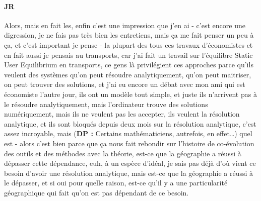 \paragraph{JR}

Alors, mais en fait les, enfin c'est une impression que j'en ai - c'est encore une digression, je ne fais pas très bien les entretiens, mais ça me fait penser un peu à ça, et c'est important je pense - la plupart des tous ces travaux d'économistes et en fait aussi je pensais au transports, car j'ai fait un travail sur l'équilibre Static User Equilibrium en transports, ce gens là privilégient ces approches parce qu'ils veulent des systèmes qu'on peut résoudre analytiquement, qu'on peut maitriser, on peut trouver des solutions, et j'ai eu encore un débat avec mon ami qui est économiste l'autre jour, ils ont un modèle tout simple, et juste ils n'arrivent pas à le résoudre analytiquement, mais l'ordinateur trouve des solutions numériquement, mais ils ne veulent pas les accepter, ils veulent la résolution analytique, et ils sont bloqués depuis deux mois sur la résolution analytique, c'est assez incroyable, mais (\textbf{DP : } Certains mathématiciens, autrefois, en effet\ldots) quel est - alors c'est bien parce que ça nous fait rebondir sur l'histoire de co-évolution des outils et des méthodes avec la théorie, est-ce que la géographie a réussi à dépasser cette dépendance, euh, à un espèce d'idéal, je sais pas déjà d'où vient ce besoin d'avoir une résolution analytique, mais est-ce que la géographie a réussi à le dépasser, et si oui pour quelle raison, est-ce qu'il y a une particularité géographique qui fait qu'on est pas dépendant de ce besoin.

















